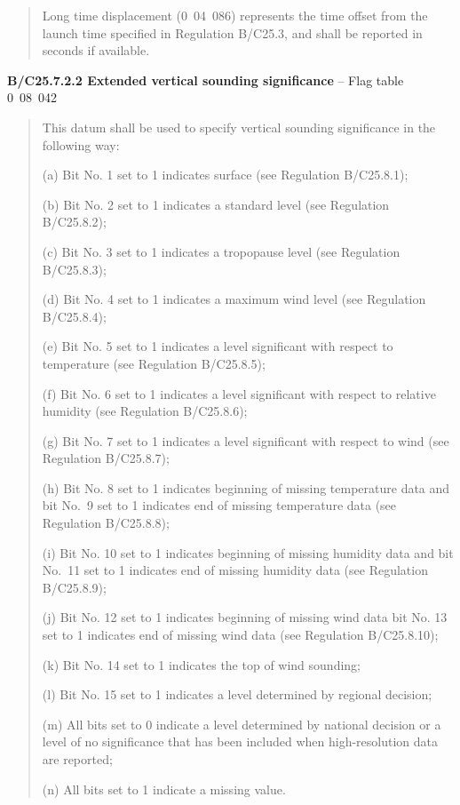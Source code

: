 \begin{quote}
Long time displacement (0~04~086) represents the time offset from the launch time specified in Regulation B/C25.3, and shall be reported in seconds if available.
\end{quote}

\textbf{B/C25.7.2.2 Extended vertical sounding significance} -- Flag table 0~08~042

\begin{quote}
This datum shall be used to specify vertical sounding significance in the following way:

(a) Bit No. 1 set to 1 indicates surface (see Regulation B/C25.8.1);

(b) Bit No. 2 set to 1 indicates a standard level (see Regulation B/C25.8.2);

(c) Bit No. 3 set to 1 indicates a tropopause level (see Regulation B/C25.8.3);

(d) Bit No. 4 set to 1 indicates a maximum wind level (see Regulation B/C25.8.4);

(e) Bit No. 5 set to 1 indicates a level significant with respect to temperature (see Regulation B/C25.8.5);

(f) Bit No. 6 set to 1 indicates a level significant with respect to relative humidity (see Regulation B/C25.8.6);

(g) Bit No. 7 set to 1 indicates a level significant with respect to wind (see Regulation B/C25.8.7);

(h) Bit No. 8 set to 1 indicates beginning of missing temperature data and bit No.~9 set to 1 indicates end of missing temperature data (see Regulation B/C25.8.8);

(i) Bit No. 10 set to 1 indicates beginning of missing humidity data and bit No.~11 set to 1 indicates end of missing humidity data (see Regulation B/C25.8.9);

(j) Bit No. 12 set to 1 indicates beginning of missing wind data bit No. 13 set to 1 indicates end of missing wind data (see Regulation B/C25.8.10);

(k) Bit No. 14 set to 1 indicates the top of wind sounding;

(l) Bit No. 15 set to 1 indicates a level determined by regional decision;

(m) All bits set to 0 indicate a level determined by national decision or a level of no significance that has been included when high-resolution data are reported;

(n) All bits set to 1 indicate a missing value.
\end{quote}

